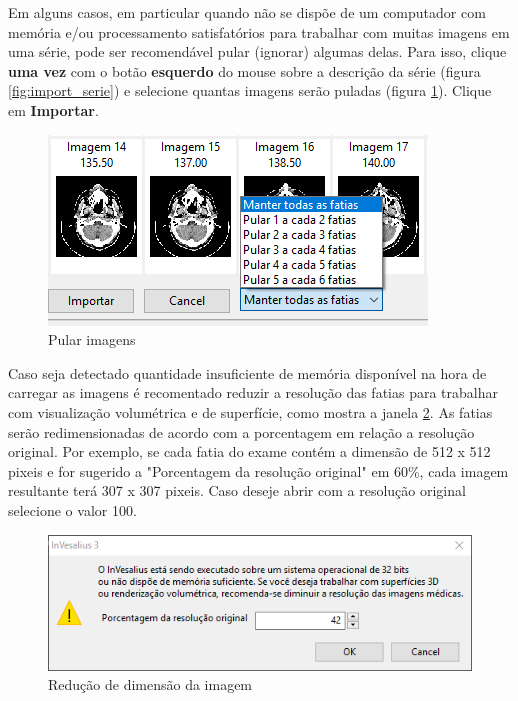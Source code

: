 Em alguns casos, em particular quando não se dispõe de um computador com memória e/ou
processamento satisfatórios para trabalhar com muitas imagens em uma série, pode ser
recomendável pular (ignorar) algumas delas. Para isso, clique \textbf{uma vez} com o botão
\textbf{esquerdo} do mouse sobre a descrição da série (figura \ref{fig:import_serie}) e selecione
quantas imagens serão puladas (figura \ref{fig:skip_image}). Clique em \textbf{Importar}.

\begin{figure}[!htb]
\centering
\includegraphics[scale=0.6]{../user_guide_figures/invesalius_screen/import_window_skip_slice_pt.png}
\caption{Pular imagens}
\label{fig:skip_image}
\end{figure}


Caso seja detectado quantidade insuficiente de memória disponível na hora de carregar as imagens é recomentado 
reduzir a resolução das fatias para trabalhar com visualização volumétrica e de superfície, como mostra a janela \ref{fig:resize_image}. 
As fatias serão redimensionadas de acordo com a porcentagem em relação a resolução original. Por exemplo, 
se cada fatia do exame contém a dimensão de 512 x 512 pixeis e for sugerido a "Porcentagem da resolução original" em 60\%, 
cada imagem resultante terá 307 x 307 pixeis. Caso deseje abrir com a resolução original selecione o valor 100.

\begin{figure}[!htb]
\centering
\includegraphics[scale=0.5]{../user_guide_figures/invesalius_screen/import_window_lower_memory_pt.png}
\caption{Redução de dimensão da imagem}
\label{fig:resize_image}
\end{figure}

